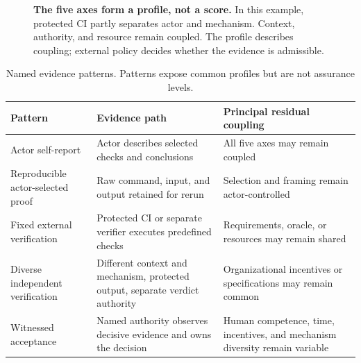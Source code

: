 \documentclass[11pt]{article}
\begin{document}
\begin{figure}[t]
\caption{\textbf{The five axes form a profile, not a score.} In this example, protected CI partly separates actor and mechanism. Context, authority, and resource remain coupled. The profile describes coupling; external policy decides whether the evidence is admissible.}
\label{fig:coupling-profile}
\end{figure}

\begin{table}[t]
\centering
\caption{Named evidence patterns. Patterns expose common profiles but are not assurance levels.}
\label{tab:profiles}
\small
\begin{tabularx}{\textwidth}{>{\raggedright\arraybackslash}p{} X >{\raggedright\arraybackslash}p{}}
\toprule
Pattern & Evidence path & Principal residual coupling \\
\midrule
Actor self-report & Actor describes selected checks and conclusions & All five axes may remain coupled \\
Reproducible actor-selected proof & Raw command, input, and output retained for rerun & Selection and framing remain actor-controlled \\
Fixed external verification & Protected CI or separate verifier executes predefined checks & Requirements, oracle, or resources may remain shared \\
Diverse independent verification & Different context and mechanism, protected output, separate verdict authority & Organizational incentives or specifications may remain common \\
Witnessed acceptance & Named authority observes decisive evidence and owns the decision & Human competence, time, incentives, and mechanism diversity remain variable \\
\bottomrule
\end{tabularx}
\end{table}
\end{document}
